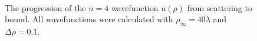 \documentclass[12pt,twoside]{reedthesis}
\begin{document}
\begin{figure}
\centering {}
 \\ 
\caption[The progression of an eigenstate from scattering to bound]
{The progression of the $n = 4$ wavefunction $u(\rho)$ from scattering to bound. All wavefunctions were calculated with $\rho_{\infty} = 40 \lambda$ and $\Delta \rho = 0.1$.} 
\label{fig:scatt-to-bound}
\end{figure}
\end{document}
